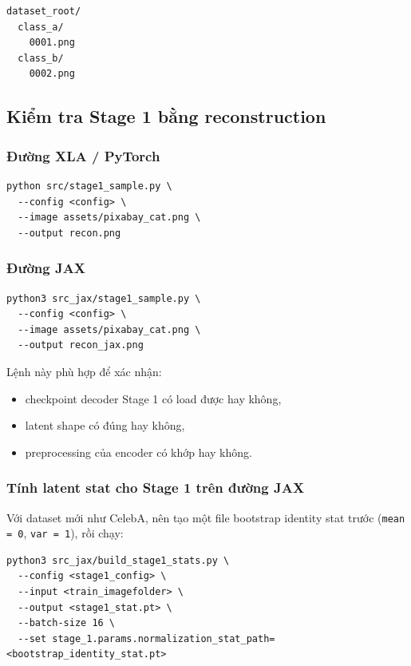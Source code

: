 \begin{lstlisting}[style=rae]
dataset_root/
  class_a/
    0001.png
  class_b/
    0002.png
\end{lstlisting}

\subsection{Kiểm tra Stage 1 bằng reconstruction}

\subsubsection{Đường XLA / PyTorch}

\begin{lstlisting}[style=rae]
python src/stage1_sample.py \
  --config <config> \
  --image assets/pixabay_cat.png \
  --output recon.png
\end{lstlisting}

\subsubsection{Đường JAX}

\begin{lstlisting}[style=rae]
python3 src_jax/stage1_sample.py \
  --config <config> \
  --image assets/pixabay_cat.png \
  --output recon_jax.png
\end{lstlisting}

Lệnh này phù hợp để xác nhận:

\begin{itemize}[leftmargin=1.5em]
  \item checkpoint decoder Stage 1 có load được hay không,
  \item latent shape có đúng hay không,
  \item preprocessing của encoder có khớp hay không.
\end{itemize}

\subsubsection{Tính latent stat cho Stage 1 trên đường JAX}

Với dataset mới như CelebA, nên tạo một file bootstrap identity stat trước
(\texttt{mean = 0}, \texttt{var = 1}), rồi chạy:

\begin{lstlisting}[style=rae]
python3 src_jax/build_stage1_stats.py \
  --config <stage1_config> \
  --input <train_imagefolder> \
  --output <stage1_stat.pt> \
  --batch-size 16 \
  --set stage_1.params.normalization_stat_path=<bootstrap_identity_stat.pt>
\end{lstlisting}

